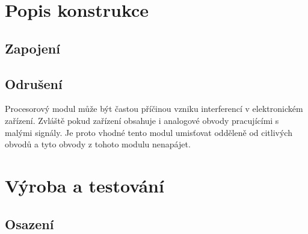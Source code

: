 \documentclass[12pt,a4paper,oneside]{article}
\begin{document}
\newpage
\section{Popis konstrukce}

\subsection{Zapojení}



\subsection{Odrušení}

Procesorový modul může být častou příčinou vzniku interferencí v elektronickém zařízení. Zvláště pokud zařízení obsahuje i analogové obvody pracujícími s malými signály. Je proto vhodné tento modul umisťovat odděleně od citlivých obvodů a tyto obvody z tohoto modulu nenapájet.

\section{Výroba a testování}

\subsection{Osazení}
\end{document}
